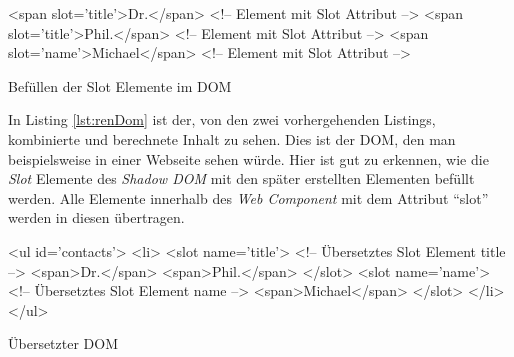 \documentclass[12pt, paper=a4, bibtotoc, toc=listof, headsepline=true, numbers=endperiod]{scrreprt}
\begin{document}
			\begin{listing}
				\begin{HTMLcode*}{}
<span slot='title'>Dr.</span> <!-- Element mit Slot Attribut -->
<span slot='title'>Phil.</span> <!-- Element mit Slot Attribut -->
<span slot='name'>Michael</span> <!-- Element mit Slot Attribut -->
				\end{HTMLcode*}
				\caption{Befüllen der Slot Elemente im DOM}
				\label{lst:sloNutLigDom}
			\end{listing}
			In Listing \ref{lst:renDom} ist der, von den zwei vorhergehenden Listings,  kombinierte und berechnete Inhalt zu sehen. Dies ist der \ac{DOM}, den man beispielsweise in einer Webseite sehen würde. Hier ist gut zu erkennen, wie die \emph{Slot} Elemente des \emph{Shadow \ac{DOM}} mit den später erstellten Elementen befüllt werden. Alle Elemente innerhalb des \emph{Web Component} mit dem Attribut \enquote{slot} werden in diesen übertragen.
			\begin{listing}
				\begin{HTMLcode*}{}
<ul id='contacts'>
   <li>
      <slot name='title'> <!-- Übersetztes Slot Element title -->
	     <span>Dr.</span>
	     <span>Phil.</span>
	  </slot>
      <slot name='name'> <!-- Übersetztes Slot Element name -->
	     <span>Michael</span>
      </slot>
   </li>
</ul>
				\end{HTMLcode*}
				\caption{Übersetzter DOM}
				\label{lst:renDom}
			\end{listing}
\end{document}
